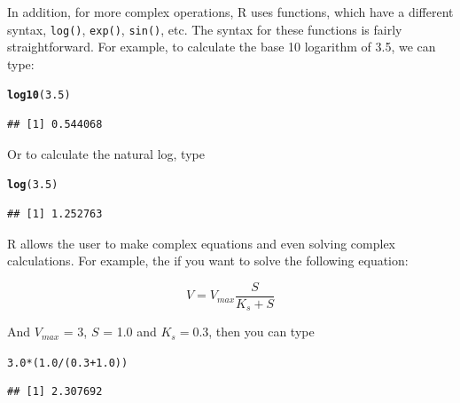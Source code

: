 \documentclass{tufte-handout}\usepackage[]{graphicx}\usepackage[]{xcolor}
\makeatletter
\newcommand{\hlnum}[1]{\textcolor[rgb]{0.686,0.059,0.569}{#1}}%
\newcommand{\hlopt}[1]{\textcolor[rgb]{0,0,0}{#1}}%
\newcommand{\hlstd}[1]{\textcolor[rgb]{0.345,0.345,0.345}{#1}}%
\newcommand{\hlkwd}[1]{\textcolor[rgb]{0.737,0.353,0.396}{\textbf{#1}}}%
\newenvironment{kframe}{%
 \def\at@end@of@kframe{}%
 \ifinner\ifhmode%
  \def\at@end@of@kframe{\end{minipage}}%
  \begin{minipage}{\columnwidth}%
 \fi\fi%
 \def\FrameCommand##1{\hskip\@totalleftmargin \hskip-\fboxsep
 \colorbox{shadecolor}{##1}\hskip-\fboxsep
     \hskip-\linewidth \hskip-\@totalleftmargin \hskip\columnwidth}%
 \MakeFramed {\advance\hsize-\width
   \@totalleftmargin\z@ \linewidth\hsize
   \@setminipage}}%
 {\par\unskip\endMakeFramed%
 \at@end@of@kframe}
\newenvironment{knitrout}{}{} %
\makeatother
\begin{document}
In addition, for more complex operations, R uses functions, which have a different syntax, \eg \texttt{log()}, \texttt{exp()}, \texttt{sin()}, etc. The syntax for these functions is fairly straightforward. For example, to calculate the base 10 logarithm of 3.5, we can type:

\begin{knitrout}
\color{fgcolor}\begin{kframe}
\begin{alltt}
\hlkwd{log10}\hlstd{(}\hlnum{3.5}\hlstd{)}
\end{alltt}
\begin{verbatim}
## [1] 0.544068
\end{verbatim}
\end{kframe}
\end{knitrout}

Or to calculate the natural log, type
\begin{knitrout}
\color{fgcolor}\begin{kframe}
\begin{alltt}
\hlkwd{log}\hlstd{(}\hlnum{3.5}\hlstd{)}
\end{alltt}
\begin{verbatim}
## [1] 1.252763
\end{verbatim}
\end{kframe}
\end{knitrout}

R allows the user to make complex equations and even solving complex calculations. For example, the if you want to solve the following equation:

\begin{equation}
V = V_{max}\frac{S}{K_s + S}
\end{equation}

And $V_{max}$ = 3, $S$ = 1.0 and $K_s = 0.3$, then you can type

\begin{knitrout}
\color{fgcolor}\begin{kframe}
\begin{alltt}
\hlnum{3.0} \hlopt{*} \hlstd{(}\hlnum{1.0} \hlopt{/} \hlstd{(}\hlnum{0.3} \hlopt{+} \hlnum{1.0}\hlstd{))}
\end{alltt}
\begin{verbatim}
## [1] 2.307692
\end{verbatim}
\end{kframe}
\end{knitrout}
\end{document}

